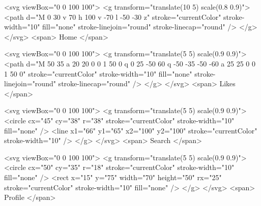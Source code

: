 <svg viewBox="0 0 100 100">
        <g transform="translate(10 5) scale(0.8 0.9)">
          <path d="M 0 30 v 70 h 100 v -70 l -50 -30 z" stroke="currentColor" stroke-width="10" fill="none"
            stroke-linejoin="round" stroke-linecap="round" />
        </g>
      </svg>
      <span>
        Home
      </span>


      <svg viewBox="0 0 100 100">
        <g transform="translate(5 5) scale(0.9 0.9)">
          <path d="M 50 35 a 20 20 0 0 1 50 0 q 0 25 -50 60 q -50 -35 -50 -60 a 25 25 0 0 1 50 0" stroke="currentColor"
            stroke-width="10" fill="none" stroke-linejoin="round" stroke-linecap="round" />
        </g>
      </svg>
      <span>
        Likes
      </span>



      <svg viewBox="0 0 100 100">
      <g transform="translate(5 5) scale(0.9 0.9)">
        <circle cx="45" cy="38" r="38" stroke="currentColor" stroke-width="10" fill="none" />
        <line x1="66" y1="65" x2="100" y2="100" stroke="currentColor" stroke-width="10" />
      </g>
    </svg>
    <span>
      Search
    </span>



    <svg viewBox="0 0 100 100">
        <g transform="translate(5 5) scale(0.9 0.9)">
          <circle cx="50" cy="35" r="18" stroke="currentColor" stroke-width="10" fill="none" />
          <rect x="15" y="75" width="70" height="50" rx="25" stroke="currentColor" stroke-width="10" fill="none" />
        </g>
      </svg>
      <span>
        Profile
      </span>

